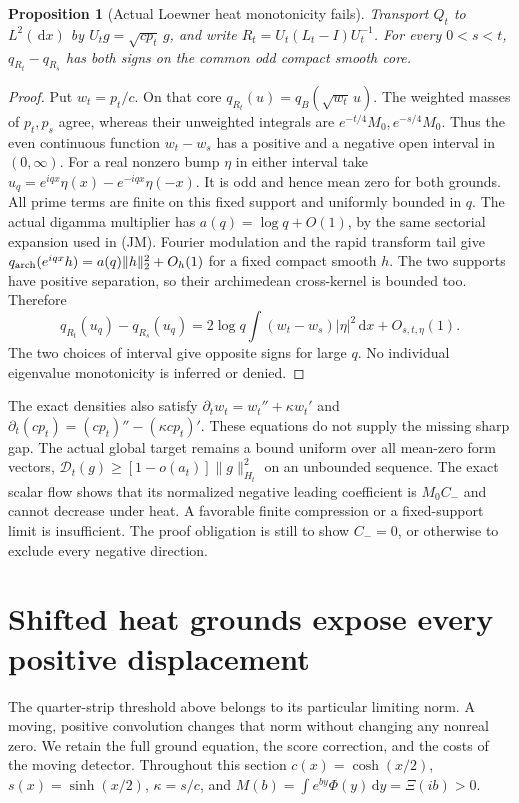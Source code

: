 \documentclass[11pt]{article}
\newtheorem{proposition}[theorem]{Proposition}
\theoremstyle{remark}\newtheorem{remark}[theorem]{Remark}
\newcommand{\dd}{\,\mathrm d}
\begin{document}
\begin{proposition}[Actual Loewner heat monotonicity fails]
\label{prop:heat-loewner-failure}
Transport $Q_t$ to $L^2(\dd x)$ by
$U_tg=\sqrt{cp_t}\,g$, and write $R_t=U_t(L_t-I)U_t^{-1}$.
For every $0<s<t$, $q_{R_t}-q_{R_s}$ has both signs on the
common odd compact smooth core.
\end{proposition}
\begin{proof}
Put $w_t=p_t/c$. On that core
$q_{R_t}(u)=q_B(\sqrt{w_t}\,u)$.
The weighted masses of $p_t,p_s$ agree, whereas their
unweighted integrals are $e^{-t/4}M_0,e^{-s/4}M_0$.
Thus the even continuous function $w_t-w_s$ has a positive
and a negative open interval in $(0,\infty)$.
For a real nonzero bump $\eta$ in either interval take
$u_q=e^{iqx}\eta(x)-e^{-iqx}\eta(-x)$.
It is odd and hence mean zero for both grounds.
All prime terms are finite on this fixed support and
uniformly bounded in $q$. The actual digamma multiplier has
$a(q)=\log q+O(1)$, by the same sectorial expansion
\cite[eq.~5.11.2]{DLMF} used in (JM).
Fourier modulation and the rapid transform tail give
$q_{\rm arch}(e^{iqx}h)=a(q)\|h\|_2^2+O_h(1)$ for a fixed
compact smooth $h$. The two supports have positive separation,
so their archimedean cross-kernel is bounded too. Therefore
\[
 q_{R_t}(u_q)-q_{R_s}(u_q)
   =2\log q\int(w_t-w_s)|\eta|^2\dd x+O_{s,t,\eta}(1).    \tag{HFL5}
\]
The two choices of interval give opposite signs for large $q$.
No individual eigenvalue monotonicity is inferred or denied.
\end{proof}

The exact densities also satisfy
$\partial_tw_t=w_t''+\kappa w_t'$ and
$\partial_t(cp_t)=(cp_t)''-(\kappa cp_t)'$.
These equations do not supply the missing sharp gap.
The actual global target remains a bound uniform over all
mean-zero form vectors,
$\mathcal D_t(g)\ge[1-o(a_t)]\|g\|_{H_t}^2$ on an unbounded
sequence. The exact scalar flow shows that its normalized
negative leading coefficient is $M_0C_-$ and cannot decrease
under heat. A favorable finite compression or a fixed-support
limit is insufficient. The proof obligation is still to show
$C_-=0$, or otherwise to exclude every negative direction.

\section{Shifted heat grounds expose every positive displacement}
\label{sec:shifted-heat}

The quarter-strip threshold above belongs to its particular limiting
norm. A moving, positive convolution changes that norm without
changing any nonreal zero. We retain the full ground equation,
the score correction, and the costs of the moving detector.
Throughout this section $c(x)=\cosh(x/2)$, $s(x)=\sinh(x/2)$,
$\kappa=s/c$, and $M(b)=\int e^{by}\Phi(y)\dd y=\Xi(ib)>0$.
\end{document}
